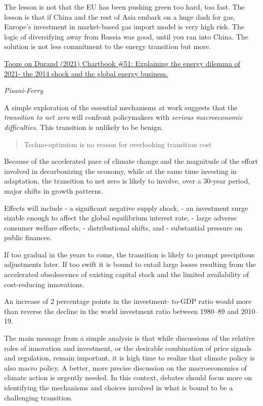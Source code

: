 \documentclass[
]{book}
\begin{document}
The lesson is not that the EU has been pushing green too hard, too fast. The lesson is that if China and the rest of Asia embark on a huge dash for gas, Europe's investment in market-based gas import model is very high risk. The logic of diversifying away from Russia was good, until you ran into China. The solution is not less commitment to the energy transition but more.

\href{https://adamtooze.substack.com/p/chartbook-51-explaining-the-energy}{Tooze on Durand (2021) Chartbook \#51: Explaining the energy dilemma of 2021- the 2014 shock and the global energy business.}

\emph{Pisani-Ferry}

A simple exploration
of the essential mechanisms at work suggests that the \emph{transition to net zero} will
confront policymakers with \emph{serious macroeconomic difficulties}. This transition is
unlikely to be benign.

\begin{quote}
Techno-optimism is no reason for overlooking transition cost
\end{quote}

Because of the accelerated pace of climate change and the magnitude of the
effort involved in decarbonizing the economy, while at the same time investing
in adaptation, the transition to net zero is likely to involve, over a 30-year period,
major shifts in growth patterns.

Effects will include
- a significant negative supply
shock,
- an investment surge sizable enough to affect the global equilibrium
interest rate,
- large adverse consumer welfare effects,
- distributional shifts, and
- substantial pressure on public finances.

If too gradual
in the years
to come,
the transition
is likely
to prompt
precipitous
adjustments
later. If too
swift it is
bound to entail
large losses
resulting from
the accelerated
obsolescence
of existing
capital stock
and the limited
availability of
cost-reducing
innovations.

An increase of
2 percentage
points in the
investment-
to-GDP ratio
would more
than reverse
the decline
in the world
investment
ratio between
1980--89 and
2010--19.

The main message from a simple analysis is that while discussions of the
relative roles of innovation and investment, or the desirable combination of
price signals and regulation, remain important, it is high time to realize that
climate policy is also macro policy. A better, more precise discussion on the
macroeconomics of climate action is urgently needed.
In this context, debates should focus more on identifying the mechanisms
and choices involved in what is bound to be a challenging transition.
\end{document}
